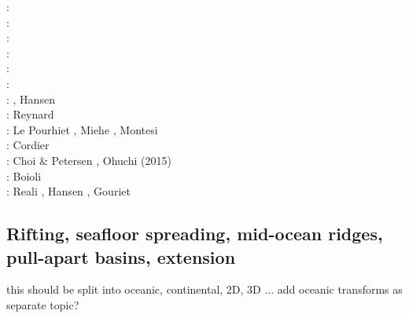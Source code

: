 \begin{scriptsize}
\twothousandthree: \cite{hiko03}\cite{kaju03}\cite{mohi03}\\
\twothousandfive: \cite{didr05}\cite{drur05}\\
\twothousandsix: \cite{rygw06}\cite{buwa06}\cite{momu06}\cite{liwr06}\\
\twothousandseven: \cite{hirw07}\cite{kohl07}\cite{faja07}\\
\twothousandeight: \cite{lemm08}\cite{budr08}\cite{koka08}\cite{gird08}\\
\twothousandnine: \cite{kayk09}\cite{kako09}\\
\twothousandeleven: \cite{lell11}\cite{kemk11}, Hansen \etal \cite{hazk11}\\
\twothousandtwelve: Reynard \cite{reyn12}\\
\twothousandthirteen: Le Pourhiet \cite{lepo13}, Miehe \etal \cite{miam13}, Montesi \cite{mont13}\\
\twothousandfourteen: Cordier \etal \cite{codb14}\\
\twothousandfifteen: Choi \& Petersen \cite{chpe15}, Ohuchi \etal (2015) \cite{ohkh15}\\
\twothousandseventeen: Boioli \etal \cite{bocc17}\\
\twothousandnineteen: Reali \etal \cite{rejv19}, Hansen \etal \cite{hakt19}, Gouriet \etal \cite{gocg19}
\end{scriptsize}

\subsection{Rifting, seafloor spreading, mid-ocean ridges, pull-apart basins, extension}

{\color{red} this should be split into oceanic, continental, 2D, 3D ...}
add oceanic transforms as separate topic?

